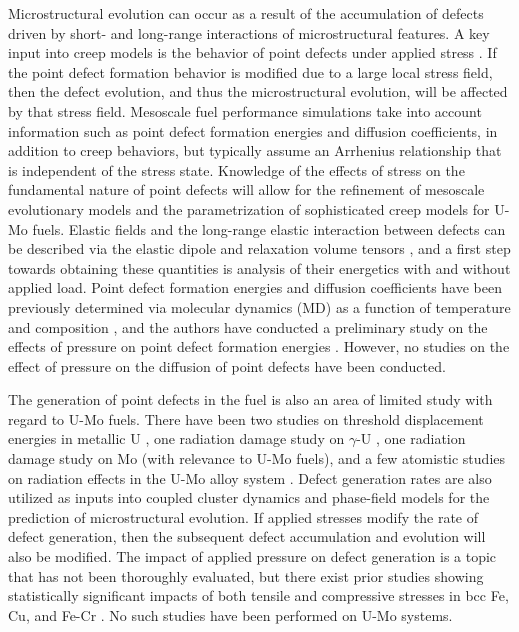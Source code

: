 \documentclass[review]{elsarticle}
\begin{document}
Microstructural evolution can occur as a result of the accumulation of defects driven by short- and long-range interactions of microstructural features. A key input into creep models is the behavior of point defects under applied stress \cite{hu2021}. If the point defect formation behavior is modified due to a large local stress field, then the defect evolution, and thus the microstructural evolution, will be affected by that stress field. Mesoscale fuel performance simulations \cite{ye2018, hu2017a, dudarev2010, ye2023} take into account information such as point defect formation energies and diffusion coefficients, in addition to creep behaviors, but typically assume an Arrhenius relationship that is independent of the stress state. Knowledge of the effects of stress on the fundamental nature of point defects will allow for the refinement of mesoscale evolutionary models and the parametrization of sophisticated creep models for U-Mo fuels. Elastic fields and the long-range elastic interaction between defects can be described via the elastic dipole and relaxation volume tensors \cite{freysoldt2014, bacon1980}, and a first step towards obtaining these quantities is analysis of their energetics with and without applied load. Point defect formation energies and diffusion coefficients have been previously determined via molecular dynamics (MD) as a function of temperature and composition \cite{park2021,starikov2018,smirnova2015,smirnovaADP}, and the authors have conducted a preliminary study on the effects of pressure on point defect formation energies \cite{beelerMRSadv}. However, no studies on the effect of pressure on the diffusion of point defects have been conducted. 

The generation of point defects in the fuel is also an area of limited study with regard to U-Mo fuels. There have been two studies on threshold displacement energies in metallic U \cite{chen2019,beelerTDE}, one radiation damage study on $\gamma$-U \cite{miao2015}, one radiation damage study on Mo \cite{starikov2011} (with relevance to U-Mo fuels), and a few atomistic studies on radiation effects in the U-Mo alloy system \cite{ouyang2021,tian2014,kolotova2017}. Defect generation rates are also utilized as inputs into coupled cluster dynamics and phase-field models \cite{hu2020,hu2021} for the prediction of microstructural evolution. If applied stresses modify the rate of defect generation, then the subsequent defect accumulation and evolution will also be modified. The impact of applied pressure on defect generation is a topic that has not been thoroughly evaluated, but there exist prior studies showing statistically significant impacts of both tensile and compressive stresses in bcc Fe, Cu, and Fe-Cr \cite{gao2001,miyashiro2011,beeler2015,abusham2018}. No such studies have been performed on U-Mo systems.
\end{document}
